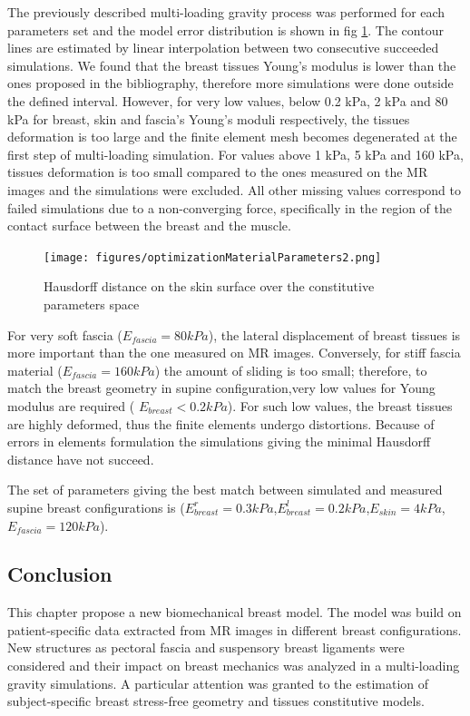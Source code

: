 The previously described multi-loading gravity process was performed for each parameters set and the model error distribution is shown in fig \ref{fig:optimizationresults}. The contour lines are estimated by linear interpolation between two consecutive succeeded simulations. We found that the breast tissues Young's modulus is lower than the ones proposed in the bibliography, therefore more simulations were done outside the defined interval. However, for very low values, below 0.2 kPa, 2 kPa and 80 kPa for breast, skin and fascia's Young's moduli respectively, the tissues deformation is too large and the finite element mesh becomes degenerated at the first step of multi-loading simulation. For values above 1 kPa, 5 kPa and 160 kPa, tissues deformation is too small compared to the ones measured on the MR images and the simulations were excluded. All other missing values correspond to failed simulations due to a non-converging force, specifically in the region of the contact surface between the breast and the muscle.

\begin{figure}[!h]
\centering
\texttt{[image: figures/optimizationMaterialParameters2.png]} 
\caption{Hausdorff distance on the skin surface over the constitutive parameters space}\label{fig:optimizationresults}
\end{figure}

 

For very soft fascia ($E_{fascia} = 80kPa$), the lateral displacement of breast tissues is more important than the one measured on  MR images. Conversely, for stiff fascia material ($E_{fascia}=160 kPa$) the amount of sliding is too small; therefore, to match the breast geometry in supine configuration,very low values for Young modulus are required ( $E_{breast}< 0.2kPa$). For such low values, the breast tissues are highly deformed, thus the finite elements undergo distortions. Because of  errors in elements formulation the simulations giving the minimal Hausdorff distance have not succeed.   

The set of parameters giving the best match between simulated and measured supine breast configurations is ($E_{breast}^r=0.3 kPa$,$E_{breast}^l=0.2 kPa$,$E_{skin}=4 kPa$,$E_{fascia}=120 kPa$).  


\subsection{Conclusion}


This chapter propose a new biomechanical breast model. The model was build on patient-specific data extracted from MR images in different breast configurations. New structures as pectoral fascia and suspensory breast ligaments were considered and their impact on breast mechanics was analyzed in a multi-loading gravity simulations.  A particular attention was granted to the estimation of subject-specific breast stress-free geometry and tissues constitutive models.
 
